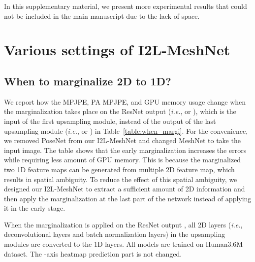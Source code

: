 \documentclass[runningheads]{llncs}
\begin{document}
In this supplementary material, we present more experimental results that could not be included in the main manuscript due to the lack of space.

\section{Various settings of I2L-MeshNet}
\subsection{When to marginalize 2D to 1D?}
We report how the MPJPE, PA MPJPE, and GPU memory usage change when the marginalization takes place on the ResNet output (\textit{i.e.},  or ), which is the input of the first upsampling module, instead of the output of the last upsampling module (\textit{i.e.},  or ) in Table~\ref{table:when_margi}.
For the convenience, we removed PoseNet from our I2L-MeshNet and changed MeshNet to take the input image.
The table shows that the early marginalization increases the errors while requiring less amount of GPU memory.
This is because the marginalized two 1D feature maps can be generated from multiple 2D feature map, which results in spatial ambiguity.
To reduce the effect of this spatial ambiguity, we designed our I2L-MeshNet to extract a sufficient amount of 2D information and then apply the marginalization at the last part of the network instead of applying it in the early stage.

When the marginalization is applied on the ResNet output , all 2D layers (\textit{i.e.}, deconvolutional layers and batch normalization layers) in the upsampling modules are converted to the 1D layers.
All models are trained on Human3.6M dataset.
The -axis heatmap prediction part is not changed.

\begin{table}
\centering
\setlength\tabcolsep{1.0pt}
\def\arraystretch{1.1}
\caption{The MPJPE, PA MPJPE, and GPU memory usage comparison between various marginalization settings on Human3.6M dataset.}
\vspace*{-7mm}
\label{table:when_margi}
\end{table}
\end{document}

